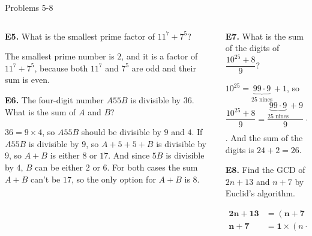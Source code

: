 \documentclass[9pt,aspectratio=169]{beamer}
\begin{document}
\begin{frame}{Problems 5-8}
  \begin{columns}[T]
    \begin{column}{0.5\textwidth}
        \begin{problem}
            \textbf{E5.} What is the smallest prime factor of $11^7 + 7^5$?
        \end{problem}
        The smallest prime number is $2$, and it is a factor of $11^7 + 7^5$, because both $11^7$ and $7^5$ are odd and their sum is even.

        \begin{problem}
            \textbf{E6.} The four-digit number $A55B$ is divisible by $36$. What is the sum of $A$ and $B$?
        \end{problem}
        $36 = 9 \times 4$, so $A55B$ should be divisible by $9$ and $4$. If $A55B$ is divisible by $9$, so $A + 5 + 5 + B$ is divisible by $9$, so $A + B$ is either $8$ or $17$. And since $5B$ is divisible by $4$, $B$ can be either $2$ or $6$. For both cases the sum $A + B$ can't be $17$, so the only option for $A + B$ is $\boxed{8}$. 
    \end{column}
    \begin{column}{0.5\textwidth}
        \begin{problem}
            \textbf{E7.} What is the sum of the digits of $\dfrac{10^{25}+8}{9}$?
        \end{problem}
        $10^{25} = \underbrace{99\cdot 9}_{25\text{ nines}} + 1$, so $\dfrac{10^{25}+8}{9} = \dfrac{\underbrace{99\cdot 9}_{25\text{ nines}} + 9}{9} = \underbrace{11\cdot 1}_{25\text{ ones}} + 1 = \underbrace{11\cdot 1}_{24\text{ nines}}\!2$.
        And the sum of the digits is $24 + 2 = \boxed{26}$.
        \begin{problem}
            \textbf{E8.} Find the GCD of $2n+13$ and $n+7$ by Euclid's algorithm.
        \end{problem}
        \begin{align*}
            \mathbf{2n + 13} &= (\mathbf{n+7}) \times 2 - 1,\\
            \mathbf{n + 7} &= \boxed{\mathbf{1}} \times (n + 7) + 0.
        \end{align*}

    \end{column}
  \end{columns}
\end{frame}
\end{document}
